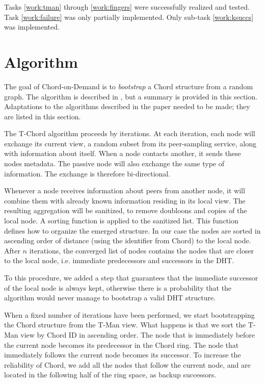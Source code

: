 \documentclass[11pt,a4paper,parskip=half]{scrartcl}
\begin{document}
Tasks \ref{work:tman} through \ref{work:fingers} were successfully realized and tested.
Task \ref{work:failure} was only partially implemented.
Only sub-task \ref{work:ksuccs} was implemented.

\section{Algorithm}

The goal of Chord-on-Demand is to \textit{bootstrap} a Chord structure from a random graph.
The algorithm is described in \autocite{cod}, but a summary is provided in this section.
Adaptations to the algorithms described in the paper needed to be made; they are listed in this section.

The T-Chord algorithm proceeds by iterations.
At each iteration, each node will exchange its current view, a random subset from its peer-sampling service, along with information about itself.
When a node contacts another, it sends these nodes metadata.
The passive node will also exchange the same type of information.
The exchange is therefore bi-directional.

Whenever a node receives information about peers from another node, it will combine them with already known information residing in its local view.
The resulting aggregation will be sanitized, to remove doubloons and copies of the local node.
A sorting function is applied to the sanitized list.
This function defines how to organize the emerged structure.
In our case the nodes are sorted in ascending order of distance (using the identifier from Chord) to the local node.
After $n$ iterations, the converged list of nodes contains the nodes that are closer to the local node, i.e. immediate predecessors and successors in the DHT.

To this procedure, we added a step that guarantees that the immediate successor of the local node is always kept, otherwise there is a probability that the algorithm would never manage to bootstrap a valid DHT structure.

When a fixed number of iterations have been performed, we start bootstrapping the Chord structure from the T-Man view.
What happens is that we sort the T-Man view by Chord ID in ascending order.
The node that is immediately before the current node becomes its predecessor in the Chord ring.
The node that immediately follows the current node becomes its successor.
To increase the reliability of Chord, we add all the nodes that follow the current node, and are located in the following half of the ring space, as backup successors.
\end{document}
